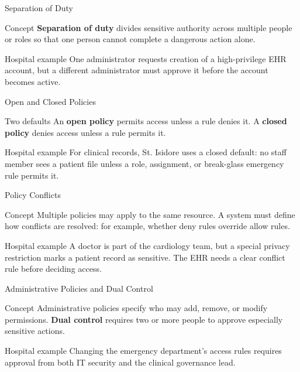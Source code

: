 \documentclass[presentation]{beamer}
\begin{document}
\begin{frame}[c]{Separation of Duty}
\begin{block}{Concept}
\textbf{Separation of duty} divides sensitive authority across multiple people or roles so that one
person cannot complete a dangerous action alone.
\end{block}

\begin{exampleblock}{Hospital example}
One administrator requests creation of a high-privilege EHR account, but a different administrator
must approve it before the account becomes active.
\end{exampleblock}
\end{frame}

\begin{frame}[c]{Open and Closed Policies}
\begin{block}{Two defaults}
An \textbf{open policy} permits access unless a rule denies it. A \textbf{closed policy} denies
access unless a rule permits it.
\end{block}

\begin{exampleblock}{Hospital example}
For clinical records, St. Isidore uses a closed default: no staff member sees a patient file unless
a role, assignment, or break-glass emergency rule permits it.
\end{exampleblock}
\end{frame}

\begin{frame}[c]{Policy Conflicts}
\begin{block}{Concept}
Multiple policies may apply to the same resource. A system must define how conflicts are resolved:
for example, whether deny rules override allow rules.
\end{block}

\begin{exampleblock}{Hospital example}
A doctor is part of the cardiology team, but a special privacy restriction marks a patient record as
sensitive. The EHR needs a clear conflict rule before deciding access.
\end{exampleblock}
\end{frame}

\begin{frame}[c]{Administrative Policies and Dual Control}
\begin{block}{Concept}
Administrative policies specify who may add, remove, or modify permissions. \textbf{Dual control}
requires two or more people to approve especially sensitive actions.
\end{block}

\begin{exampleblock}{Hospital example}
Changing the emergency department's access rules requires approval from both IT security and the
clinical governance lead.
\end{exampleblock}
\end{frame}
\end{document}
